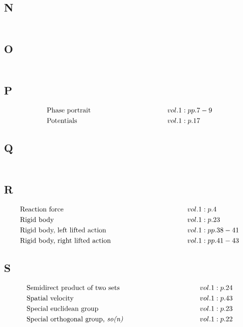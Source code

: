 \documentclass[a4paper]{article}
\begin{document}
\subsection*{N} 
\begin{align*} 
\end{align*} 
\subsection*{O} 
\begin{align*} 
\end{align*} 
\subsection*{P} 
\begin{align*} 
&\text{Phase portrait} \hspace*{10em}&& vol. 1: pp. 7-9\\
&\text{Potentials} \hspace*{10em}&& vol. 1: p. 17\\
\end{align*} 
\subsection*{Q} 
\begin{align*} 
\end{align*} 
\subsection*{R} 
\begin{align*} 
&\text{Reaction force} \hspace*{10em}&& vol. 1: p. 4\\
&\text{Rigid body} \hspace*{10em}&& vol. 1: p. 23\\
&\text{Rigid body, left lifted action} \hspace*{10em}&& vol. 1: pp. 38-41\\
&\text{Rigid body, right lifted action} \hspace*{10em}&& vol. 1: pp. 41-43\\
\end{align*} 
\subsection*{S} 
\begin{align*} 
&\text{Semidirect product of two sets} \hspace*{10em}&& vol. 1: p. 24\\
&\text{Spatial velocity} \hspace*{10em}&& vol. 1: p. 43\\
&\text{Special euclidean group} \hspace*{10em}&& vol. 1: p. 23\\
&\text{Special orthogonal group, \emph{so(n)}} \hspace*{10em}&& vol. 1: p. 22\\
\end{align*} 
\end{document}
